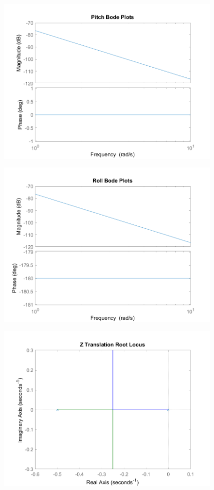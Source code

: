 \documentclass[12pt]{article}
\begin{document}
\begin{figure}[h]
\includegraphics[width=0.75\linewidth]{images/Pitch_bode.png}
\centering
\end{figure}

\begin{figure}[h]
\includegraphics[width=0.75\linewidth]{images/Roll_bode.png}
\centering
\end{figure}

\begin{figure}[h]
\includegraphics[width=0.75\linewidth]{images/Z_rootlocus.png}
\centering
\end{figure}
\end{document}

